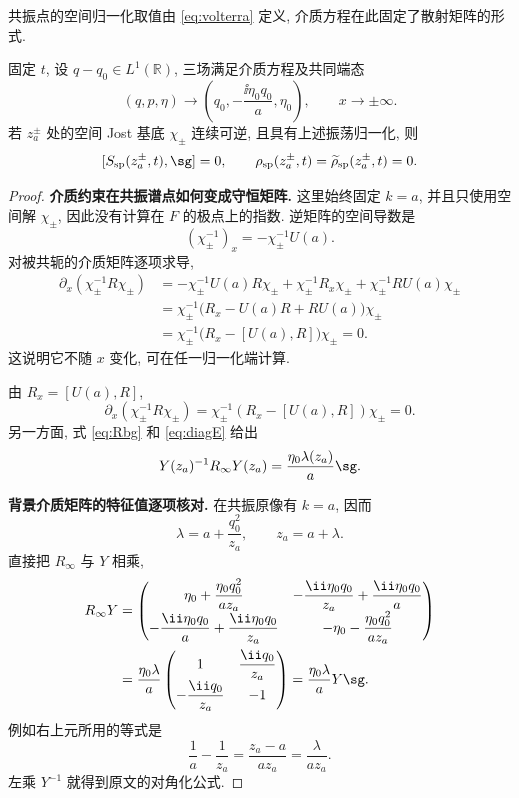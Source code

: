 共振点的空间归一化取值由 \eqref{eq:volterra} 定义, 介质方程在此固定了散射矩阵的形式.

\begin{proposition}[共振点的反射条件]\label{prop:resonance}
固定 $t$, 设 $q-q_0\in L^1(\mathbb R)$, 三场满足介质方程及共同端态
\[
(q,p,\eta)\longrightarrow\left(q_0,-\dfrac{\ii\eta_0q_0}{a},\eta_0\right),\qquad x\to\pm\infty.
\]
若 $z_a^\pm$ 处的空间 Jost 基底 $\chi_\pm$ 连续可逆, 且具有上述振荡归一化, 则
\[
[S_{\rm sp}(z_a^\pm,t),\sg]=0,\qquad
\rho_{\rm sp}(z_a^\pm,t)=\widetilde\rho_{\rm sp}(z_a^\pm,t)=0.
\]
\end{proposition}
\begin{proof}

\par\medskip\noindent\textbf{介质约束在共振谱点如何变成守恒矩阵.}\quad 
这里始终固定 $k=a$, 并且只使用空间解 $\chi_\pm$,
因此没有计算在 $F$ 的极点上的指数.
逆矩阵的空间导数是
\[
(\chi_\pm^{-1})_x=-\chi_\pm^{-1}U(a).
\]
对被共轭的介质矩阵逐项求导,
\begin{align*}
\partial_x(\chi_\pm^{-1}R\chi_\pm)
&=-\chi_\pm^{-1}U(a)R\chi_\pm
+\chi_\pm^{-1}R_x\chi_\pm
+\chi_\pm^{-1}RU(a)\chi_\pm\\
&=\chi_\pm^{-1}\bigl(R_x-U(a)R+RU(a)\bigr)\chi_\pm\\
&=\chi_\pm^{-1}\bigl(R_x-[U(a),R]\bigr)\chi_\pm=0.
\end{align*}
这说明它不随 $x$ 变化, 可在任一归一化端计算.

由 $R_x=[U(a),R]$,
\[
\partial_x(\chi_\pm^{-1}R\chi_\pm)
=\chi_\pm^{-1}(R_x-[U(a),R])\chi_\pm=0.
\]
另一方面, 式 \eqref{eq:Rbg} 和 \eqref{eq:diagE} 给出
\[
Y(z_a)^{-1}R_\infty Y(z_a)=\dfrac{\eta_0\lambda(z_a)}{a}\sg.
\]

\par\medskip\noindent\textbf{背景介质矩阵的特征值逐项核对.}\quad 
在共振原像有 $k=a$, 因而
\[
\lambda=a+\dfrac{q_0^2}{z_a},
\qquad z_a=a+\lambda.
\]
直接把 $R_\infty$ 与 $Y$ 相乘,
\begin{align*}
R_\infty Y
&=\begin{pmatrix}
\eta_0+\dfrac{\eta_0q_0^2}{az_a}&
-\dfrac{\ii\eta_0q_0}{z_a}+\dfrac{\ii\eta_0q_0}{a}\\
-\dfrac{\ii\eta_0q_0}{a}+\dfrac{\ii\eta_0q_0}{z_a}&
-\eta_0-\dfrac{\eta_0q_0^2}{az_a}
\end{pmatrix}\\
&=\dfrac{\eta_0\lambda}{a}
\begin{pmatrix}1&\dfrac{\ii q_0}{z_a}\\
-\dfrac{\ii q_0}{z_a}&-1\end{pmatrix}
=\dfrac{\eta_0\lambda}{a}Y\sg.
\end{align*}
例如右上元所用的等式是
\[
\dfrac{1}{a}-\dfrac{1}{z_a}
=\dfrac{z_a-a}{az_a}
=\dfrac{\lambda}{az_a}.
\]
左乘 $Y^{-1}$ 就得到原文的对角化公式.


\end{proof}
